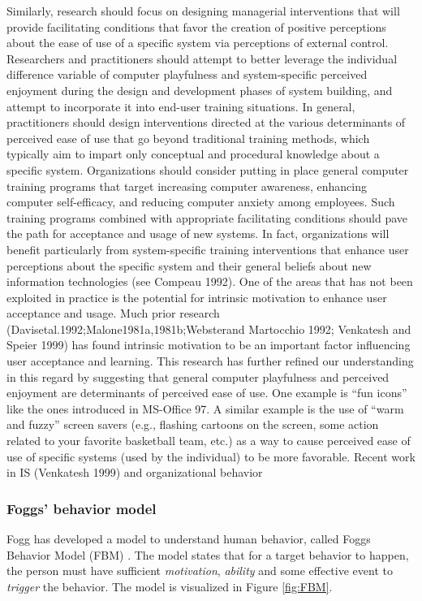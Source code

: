 {Similarly, research should focus on designing managerial interventions that will provide facilitating conditions that favor the creation of positive perceptions about the ease of use of a specific system via perceptions of external control. Researchers and practitioners should attempt to better leverage the individual difference variable of computer playfulness and system-specific perceived enjoyment during the design and development phases of system building, and attempt to incorporate it into end-user training situations. In general, practitioners should design interventions directed at the various determinants of perceived ease of use that go beyond traditional training methods, which typically aim to impart only conceptual and procedural knowledge about a specific system. Organizations should consider putting in place general computer training programs that target increasing computer awareness, enhancing computer self-efficacy, and reducing computer anxiety among employees. Such training programs combined with appropriate facilitating conditions should pave the path for acceptance and usage of new systems. In fact, organizations will benefit particularly from system-specific training interventions that enhance user perceptions about the specific system and their general beliefs about new information technologies (see Compeau 1992).
One of the areas that has not been exploited in practice is the potential for intrinsic motivation to enhance user acceptance and usage. Much prior research (Davisetal.1992;Malone1981a,1981b;Websterand Martocchio 1992; Venkatesh and Speier 1999) has found intrinsic motivation to be an important factor influencing user acceptance and learning. This research has further refined our understanding in this regard by suggesting that general computer playfulness and perceived enjoyment are determinants of perceived ease of use. One example is “fun icons” like the ones introduced in MS-Office 97. A similar example is the use of “warm and fuzzy” screen savers (e.g., flashing cartoons on the screen, some action related to your favorite basketball team, etc.) as a way to cause perceived ease of use of specific systems (used by the individual) to be more favorable. Recent work in IS (Venkatesh 1999) and organizational behavior}

\subsubsection{Foggs' behavior model}
Fogg has developed a model to understand human behavior, called Foggs Behavior Model (FBM) \cite{Fogg2009}. The model states that for a target behavior to happen, the person must have sufficient \textit{motivation}, \textit{ability} and some effective event to \textit{trigger} the behavior. The model is visualized in Figure \ref{fig:FBM}.

